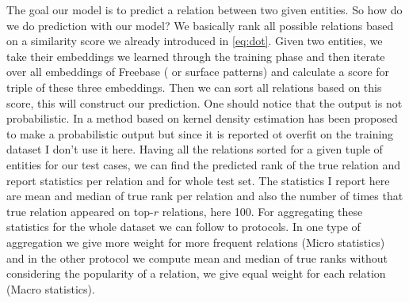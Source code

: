 The goal our model is to predict a relation between
two given entities. So how do we do prediction with our model? We basically rank
all possible relations based on a similarity score we already introduced in
\eqref{eq:dot}. Given two entities, we take their embeddings we learned through
the training phase and then iterate over all embeddings of Freebase ( or
surface patterns) and calculate a score for triple of these three embeddings.
Then we can sort all relations based on this score, this will construct our
prediction. One should notice that the output is not probabilistic. In
\cite{Bordes2011} a method based on kernel density estimation has been proposed
to make a probabilistic output but since it is reported ot overfit on the
training dataset I don't use it here. 
Having all the relations sorted for a given tuple of entities for our test
cases, we can find the predicted rank of the true relation and report statistics
per relation and for whole test set. The statistics I report here are mean and
median of true rank per relation and also the number of times that true relation
appeared on top-$r$ relations, here 100. For aggregating these statistics for
the whole dataset we can follow to protocols. In one type of aggregation we
give more weight for more frequent relations (Micro statistics) and in the other
protocol we compute mean and median of true ranks without considering the
popularity of a relation, we give equal weight for each relation (Macro
statistics).

